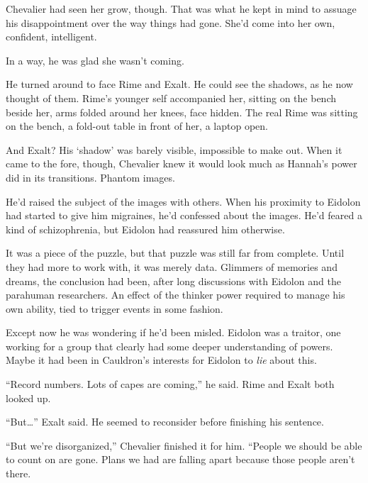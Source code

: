 Chevalier had seen her grow, though.  That was what he kept in mind to assuage his disappointment over the way things had gone.  She'd come into her own, confident, intelligent.



In a way, he was glad she wasn't coming.



He turned around to face Rime and Exalt.  He could see the shadows, as he now thought of them.  Rime's younger self accompanied her, sitting on the bench beside her, arms folded around her knees, face hidden.  The real Rime was sitting on the bench, a fold-out table in front of her, a laptop open.



And Exalt?  His `shadow' was barely visible, impossible to make out.  When it came to the fore, though, Chevalier knew it would look much as Hannah's power did in its transitions.  Phantom images.



He'd raised the subject of the images with others.  When his proximity to Eidolon had started to give him migraines, he'd confessed about the images.  He'd feared a kind of schizophrenia, but Eidolon had reassured him otherwise.



It was a piece of the puzzle, but that puzzle was still far from complete.  Until they had more to work with, it was merely data.  Glimmers of memories and dreams, the conclusion had been, after long discussions with Eidolon and the parahuman researchers.  An effect of the thinker power required to manage his own ability, tied to trigger events in some fashion.



Except now he was wondering if he'd been misled.  Eidolon was a traitor, one working for a group that clearly had some deeper understanding of powers.  Maybe it had been in Cauldron's interests for Eidolon to \emph{lie} about this.



``Record numbers.  Lots of capes are coming,'' he said.  Rime and Exalt both looked up.



``But\ldots'' Exalt said.  He seemed to reconsider before finishing his sentence.



``But we're disorganized,'' Chevalier finished it for him.  ``People we should be able to count on are gone.  Plans we had are falling apart because those people aren't there.




